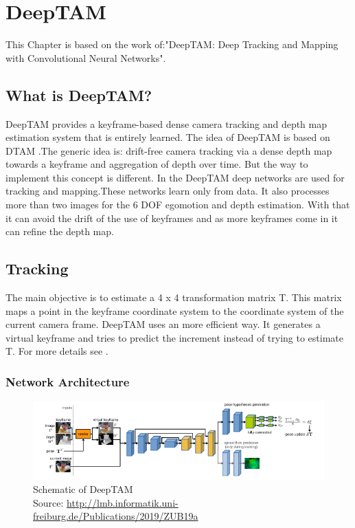 \chapter{DeepTAM\authorB}

This Chapter is based on the work of:"DeepTAM: Deep Tracking and Mapping with Convolutional Neural Networks".\cite{ZUB19a}

\section{What is DeepTAM?}
DeepTAM provides a keyframe-based dense camera tracking and depth map estimation system that is entirely learned. The idea of DeepTAM is based on DTAM \cite{dtam}.The generic idea is: drift-free camera tracking via a dense depth map towards a keyframe and aggregation of depth over time. But the way to implement this concept is different. In the DeepTAM deep networks are used for tracking and mapping.These networks learn only from data. It also processes more than two images for the 6 DOF egomotion and depth estimation. With that it can avoid the drift of the use of keyframes and as more keyframes come in it can refine the depth map.

\section{Tracking}
The main objective is to estimate a 4 x 4 transformation matrix T. This matrix maps a point in the keyframe coordinate system to the coordinate system of the current camera frame. DeepTAM uses an more efficient way. It generates a virtual keyframe and tries to predict the increment instead of trying to estimate T. For more details see \cite{ZUB19a}. 

\subsection{Network Architecture}

\begin{figure}[h]
	\centering
	\includegraphics[width=1.1\textwidth]{./media/images/DeepTAM_schematic.PNG}
  	\caption{Schematic of DeepTAM
  	\\Source: \url{http://lmb.informatik.uni-freiburg.de/Publications/2019/ZUB19a}}
  	\label{DeepTAMschematic}
\end{figure}

